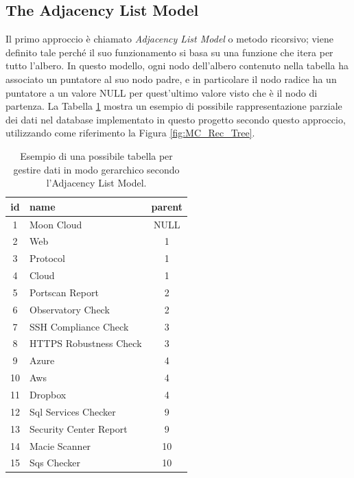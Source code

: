 \subsection{The Adjacency List Model}
Il primo approccio è chiamato \textit{Adjacency List Model} o metodo ricorsivo; viene definito tale perché il suo funzionamento si basa su una funzione che 
itera per tutto l'albero.\hfill\break
In questo modello, ogni nodo dell'albero contenuto nella tabella ha associato un puntatore al suo nodo padre, e in particolare il nodo radice ha un puntatore 
a un valore NULL per quest'ultimo valore visto che è il nodo di partenza.\hfill\break
La Tabella \ref{table:adjacency_list_model_table} mostra un esempio di possibile rappresentazione parziale dei dati nel database implementato in questo progetto 
secondo questo approccio, utilizzando come riferimento la Figura \ref{fig:MC_Rec_Tree}.
%
\begin{table}[ht!]
\centering
\begin{tabular}[c]{| c | l | c |} 
    \hline
    id & name & parent \\ [0.5ex] 
    \hline
    \rowcolor{rootnodecell} 1 & Moon Cloud & NULL \\ [0.5ex] 
    \rowcolor{categorycell} 2 & Web & 1 \\ [0.5ex] 
    \rowcolor{categorycell} 3 & Protocol & 1 \\ [0.5ex] 
    \rowcolor{categorycell} 4 & Cloud & 1 \\ [0.5ex] 
    \rowcolor{evaluationcell} 5 & Portscan Report & 2 \\ [0.5ex] 
    \rowcolor{evaluationcell} 6 & Observatory Check & 2 \\ [0.5ex] 
    \rowcolor{evaluationcell} 7 & SSH Compliance Check & 3 \\ [0.5ex] 
    \rowcolor{evaluationcell} 8 & HTTPS Robustness Check & 3 \\ [0.5ex] 
    \rowcolor{categorycell} 9 & Azure & 4 \\ [0.5ex] 
    \rowcolor{categorycell} 10 & Aws & 4 \\ [0.5ex] 
    \rowcolor{categorycell} 11 & Dropbox & 4 \\ [0.5ex] 
    \rowcolor{evaluationcell} 12 & Sql Services Checker & 9 \\ [0.5ex] 
    \rowcolor{evaluationcell} 13 & Security Center Report & 9 \\ [0.5ex] 
    \rowcolor{evaluationcell} 14 & Macie Scanner & 10 \\ [0.5ex] 
    \rowcolor{evaluationcell} 15 & Sqs Checker & 10 \\ [0.5ex]
    \hline
\end{tabular}
\caption{Esempio di una possibile tabella per gestire dati in modo gerarchico secondo l'Adjacency List Model.}
\label{table:adjacency_list_model_table}
\end{table}
